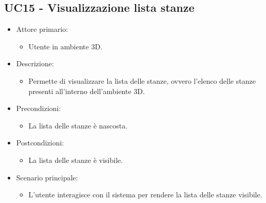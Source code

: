 \pagebreak

\subsection{UC15 - Visualizzazione lista stanze}
\begin{itemize}

	\item Attore primario: 
	\begin{itemize}
		\item Utente in ambiente 3D.
	\end{itemize}
	\item Descrizione:
	\begin{itemize}
		\item Permette di visualizzare la lista delle stanze, ovvero l'elenco delle stanze presenti all'interno dell'ambiente 3D.
	\end{itemize}
	
	\item Precondizioni:
	\begin{itemize}
		\item La lista delle stanze è nascosta.
	\end{itemize}
	
	\item Postcondizioni:
	\begin{itemize}
		\item La lista delle stanze è visibile.
	\end{itemize}
	
	\item Scenario principale:
	\begin{itemize}
		\item L'utente interagisce con il sistema per rendere la lista delle stanze visibile.
	\end{itemize}
	
\end{itemize}

\pagebreak

